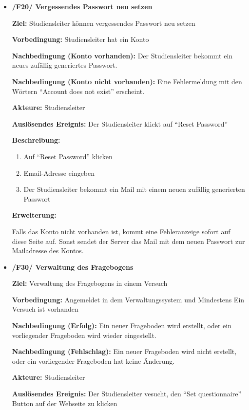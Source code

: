 \documentclass[a4paper]{scrreprt}
\begin{document}
\begin{itemize}
                \item \textbf{/F20/ Vergessendes Passwort neu setzen}

                \par \textbf{Ziel: }\gls{Studiensleiter} können vergessendes Passwort neu setzen
                \par \textbf{Vorbedingung: }\gls{Studiensleiter} hat ein Konto
                \par \textbf{Nachbedingung (Konto vorhanden): }Der \gls{Studiensleiter} bekommt ein neues zufällig generiertes Passwort.
                \par \textbf{Nachbedingung (Konto nicht vorhanden): }Eine Fehlermeldung mit den Wörtern ``Account does not exist'' erscheint.
                \par \textbf{Akteure: }\gls{Studiensleiter}
                \par \textbf{Auslösendes Ereignis: }Der \gls{Studiensleiter} klickt auf ``Reset Password''
                \par \textbf{Beschreibung: }
                \begin{enumerate}
                    \item Auf ``Reset Password'' klicken
                    \item Email-Adresse eingeben
                    \item Der \gls{Studiensleiter} bekommt ein Mail mit einem neuen zufällig generierten Passwort
                \end{enumerate}
                \par \textbf{Erweiterung: }
                    \par Falls das Konto nicht vorhanden ist, kommt eine Fehleranzeige sofort auf diese Seite auf. Sonst sendet der Server das Mail mit dem neuen Passwort zur Mailadresse des Kontos.


                \item \textbf{/F30/ Verwaltung des Fragebogens}

                \par \textbf{Ziel: }Verwaltung des Fragebogens in einem Versuch
                \par \textbf{Vorbedingung: }Angemeldet in dem Verwaltungssystem und Mindestens Ein Versuch ist vorhanden
                \par \textbf{Nachbedingung (Erfolg): }Ein neuer Frageboden wird erstellt, oder ein vorliegender Frageboden wird wieder eingestellt.
                \par \textbf{Nachbedingung (Fehlschlag): }Ein neuer Frageboden wird nicht erstellt, oder ein vorliegender Frageboden hat keine Änderung.
                \par \textbf{Akteure: }\gls{Studiensleiter}
                \par \textbf{Auslösendes Ereignis: }Der \gls{Studiensleiter} vesucht, den ``Set questionnaire'' Button auf der Webseite zu klicken


\end{itemize}
\end{document}
